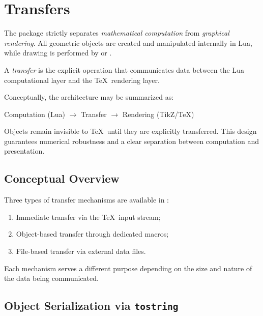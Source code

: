 \newpage
\section{Transfers}
\label{sec:transfers}

The  package strictly separates
\emph{mathematical computation} from \emph{graphical rendering}.
All geometric objects are created and manipulated internally in Lua,
while drawing is performed by  or
.

A \emph{transfer} is the explicit operation that communicates data
between the Lua computational layer and the \TeX\ rendering layer.

\medskip
Conceptually, the architecture may be summarized as:

\begin{center}
Computation (Lua) $\longrightarrow$ Transfer $\longrightarrow$ Rendering (TikZ/\TeX)
\end{center}

Objects remain invisible to \TeX\ until they are explicitly transferred.
This design guarantees numerical robustness and a clear separation
between computation and presentation.

\subsection{Conceptual Overview}

Three types of transfer mechanisms are available in
:

\begin{enumerate}
\item Immediate transfer via the \TeX\ input stream;
\item Object-based transfer through dedicated macros;
\item File-based transfer via external data files.
\end{enumerate}

Each mechanism serves a different purpose depending on the size
and nature of the data being communicated.

\subsection{Object Serialization via \texttt{tostring}}
\label{subsec:transfers_tostring}

